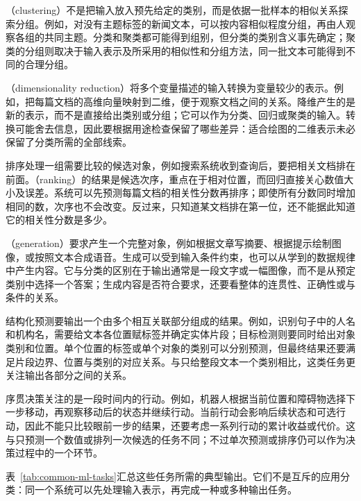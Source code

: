 （clustering）不是把输入放入预先给定的类别，而是依据一批样本的相似关系探索分组。例如，对没有主题标签的新闻文本，可以按内容相似程度分组，再由人观察各组的共同主题。分类和聚类都可能得到组别，但分类的类别含义事先确定；聚类的分组则取决于输入表示及所采用的相似性和分组方法，同一批文本可能得到不同的合理分组。

（dimensionality reduction）将多个变量描述的输入转换为变量较少的表示。例如，把每篇文档的高维向量映射到二维，便于观察文档之间的关系。降维产生的是新的表示，而不是直接给出类别或分组；它可以作为分类、回归或聚类的输入。转换可能舍去信息，因此要根据用途检查保留了哪些差异：适合绘图的二维表示未必保留了分类所需的全部线索。

排序处理一组需要比较的候选对象，例如搜索系统收到查询后，要把相关文档排在前面。（ranking）的结果是候选次序，重点在于相对位置，而回归直接关心数值大小及误差。系统可以先预测每篇文档的相关性分数再排序；即使所有分数同时增加相同的数，次序也不会改变。反过来，只知道某文档排在第一位，还不能据此知道它的相关性分数是多少。

（generation）要求产生一个完整对象，例如根据文章写摘要、根据提示绘制图像，或按照文本合成语音。生成可以受到输入条件约束，也可以从学到的数据规律中产生内容。它与分类的区别在于输出通常是一段文字或一幅图像，而不是从预定类别中选择一个答案；生成内容是否符合要求，还要看整体的连贯性、正确性或与条件的关系。

结构化预测要输出一个由多个相互关联部分组成的结果。例如，识别句子中的人名和机构名，需要给文本各位置赋标签并确定实体片段；目标检测则要同时给出对象类别和位置。单个位置的标签或单个对象的类别可以分别预测，但最终结果还要满足片段边界、位置与类别的对应关系。与只给整段文本一个类别相比，这类任务更关注输出各部分之间的关系。

序贯决策关注的是一段时间内的行动。例如，机器人根据当前位置和障碍物选择下一步移动，再观察移动后的状态并继续行动。当前行动会影响后续状态和可选行动，因此不能只比较眼前一步的结果，还要考虑一系列行动的累计收益或代价。这与只预测一个数值或排列一次候选的任务不同；不过单次预测或排序仍可以作为决策过程中的一个环节。

表~\ref{tab:common-ml-tasks}汇总这些任务所需的典型输出。它们不是互斥的应用分类：同一个系统可以先处理输入表示，再完成一种或多种输出任务。

